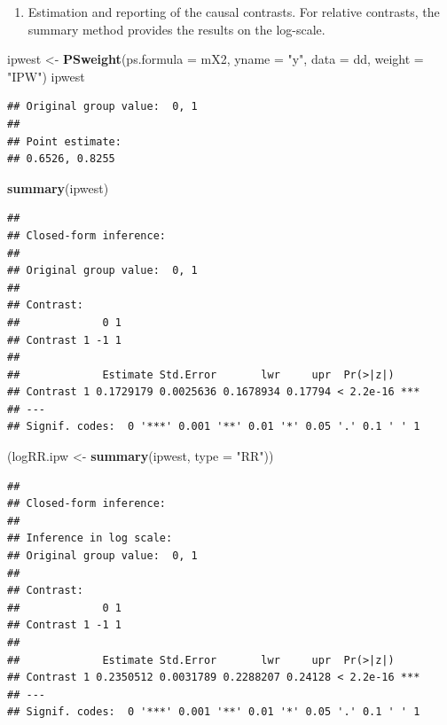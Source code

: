 \documentclass[
]{book}
\newenvironment{Shaded}{\begin{snugshade}}{\end{snugshade}}
\newcommand{\AttributeTok}[1]{\textcolor[rgb]{0.13,0.29,0.53}{#1}}
\newcommand{\FunctionTok}[1]{\textcolor[rgb]{0.13,0.29,0.53}{\textbf{#1}}}
\newcommand{\NormalTok}[1]{#1}
\newcommand{\OtherTok}[1]{\textcolor[rgb]{0.56,0.35,0.01}{#1}}
\newcommand{\StringTok}[1]{\textcolor[rgb]{0.31,0.60,0.02}{#1}}
\providecommand{\tightlist}{%
  \setlength{\itemsep}{0pt}\setlength{\parskip}{0pt}}
\begin{document}
\begin{enumerate}
\def\labelenumi{\arabic{enumi}.}
\setcounter{enumi}{2}
\tightlist
\item
  Estimation and reporting of the causal contrasts.
  For relative contrasts, the summary method provides the results
  on the log-scale.
\end{enumerate}

\begin{Shaded}
\begin{Highlighting}[]
\NormalTok{ipwest }\OtherTok{\textless{}{-}} \FunctionTok{PSweight}\NormalTok{(}\AttributeTok{ps.formula =}\NormalTok{ mX2, }\AttributeTok{yname =} \StringTok{"y"}\NormalTok{, }\AttributeTok{data =}\NormalTok{ dd, }\AttributeTok{weight =} \StringTok{"IPW"}\NormalTok{)}
\NormalTok{ipwest}
\end{Highlighting}
\end{Shaded}

\begin{verbatim}
## Original group value:  0, 1 
## 
## Point estimate: 
## 0.6526, 0.8255
\end{verbatim}

\begin{Shaded}
\begin{Highlighting}[]
\FunctionTok{summary}\NormalTok{(ipwest)}
\end{Highlighting}
\end{Shaded}

\begin{verbatim}
## 
## Closed-form inference: 
## 
## Original group value:  0, 1 
## 
## Contrast: 
##             0 1
## Contrast 1 -1 1
## 
##             Estimate Std.Error       lwr     upr  Pr(>|z|)    
## Contrast 1 0.1729179 0.0025636 0.1678934 0.17794 < 2.2e-16 ***
## ---
## Signif. codes:  0 '***' 0.001 '**' 0.01 '*' 0.05 '.' 0.1 ' ' 1
\end{verbatim}

\begin{Shaded}
\begin{Highlighting}[]
\NormalTok{(logRR.ipw }\OtherTok{\textless{}{-}} \FunctionTok{summary}\NormalTok{(ipwest, }\AttributeTok{type =} \StringTok{"RR"}\NormalTok{))}
\end{Highlighting}
\end{Shaded}

\begin{verbatim}
## 
## Closed-form inference: 
## 
## Inference in log scale: 
## Original group value:  0, 1 
## 
## Contrast: 
##             0 1
## Contrast 1 -1 1
## 
##             Estimate Std.Error       lwr     upr  Pr(>|z|)    
## Contrast 1 0.2350512 0.0031789 0.2288207 0.24128 < 2.2e-16 ***
## ---
## Signif. codes:  0 '***' 0.001 '**' 0.01 '*' 0.05 '.' 0.1 ' ' 1
\end{verbatim}
\end{document}
